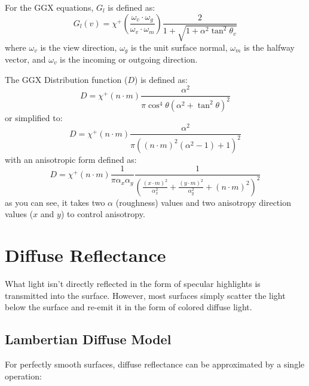 \documentclass[12pt,letterpaper]{article}
\begin{document}
For the GGX equations, $G_l$ is defined as:
$$
G_l(v) = \chi^+ \left(\frac{\omega_v \cdot \omega_g}{\omega_v \cdot \omega_m} \right)
\frac{2}{1 + \sqrt{1 + \alpha^2 \tan^2\theta_v}}
$$
where $\omega_v$ is the view direction, $\omega_g$ is the unit surface normal, $\omega_m$ is the halfway vector, and $\omega_v$ is the incoming or outgoing direction.

The GGX Distribution function ($D$) is defined as:
$$
D = \chi^+\left(n \cdot m\right) \frac{\alpha^2}{\pi \cos^4\theta {\left(  \alpha^2 + \tan^2\theta \right)}^2}
$$
or simplified to:
$$
D = \chi^+\left(n \cdot m\right) \frac{\alpha^2}{\pi {\left( {\left( n \cdot m \right)}^2 \left(\alpha^2 - 1\right) + 1 \right)}^2}
$$
with an anisotropic form defined as:
$$
D = \chi^+\left(n \cdot m\right) \frac{1}{\pi \alpha_x \alpha_y} \frac{1}{{\left(
    \frac{{\left( x \cdot m \right)}^2}{\alpha^{2}_{x}} +
    \frac{{\left( y \cdot m \right)}^2}{\alpha^{2}_{y}} +
    {\left( n \cdot m \right)}^2
\right)}^2}
$$
as you can see, it takes two $\alpha$ (roughness) values and two anisotropy direction values ($x$ and $y$) to control anisotropy.

\newpage

\section{Diffuse Reflectance}

What light isn't directly reflected in the form of specular highlights is transmitted into the surface. However, most surfaces simply scatter the light 
below the surface and re-emit it in the form of colored diffuse light.

\subsection{Lambertian Diffuse Model}

For perfectly smooth surfaces, diffuse reflectance can be approximated by a single operation:
\end{document}
